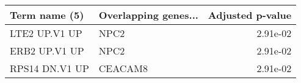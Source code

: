 \begin{tabular}{llr}
\toprule
 Term name (5) & Overlapping genes... &  Adjusted p-value \\
\midrule
 LTE2 UP.V1 UP &                 NPC2 &          2.91e-02 \\
 ERB2 UP.V1 UP &                 NPC2 &          2.91e-02 \\
RPS14 DN.V1 UP &              CEACAM8 &          2.91e-02 \\
\bottomrule
\end{tabular}
